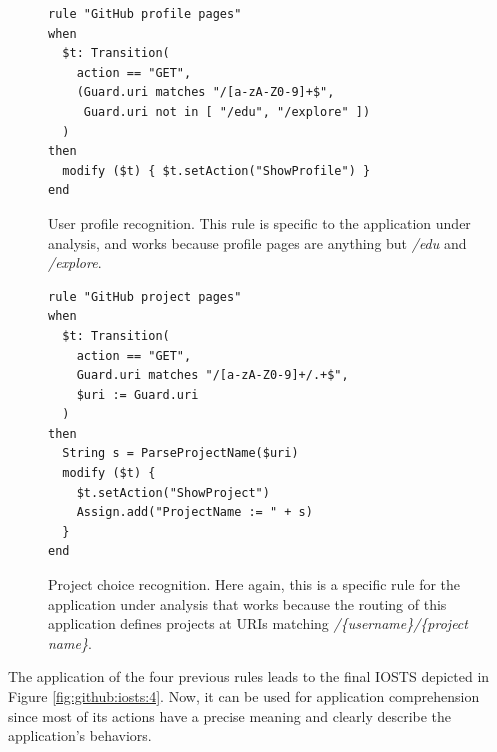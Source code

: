 \begin{figure}
\begin{framed}
\begin{BVerbatim}
rule "GitHub profile pages"
when
  $t: Transition(
    action == "GET",
    (Guard.uri matches "/[a-zA-Z0-9]+$",
     Guard.uri not in [ "/edu", "/explore" ])
  )
then
  modify ($t) { $t.setAction("ShowProfile") }
end
\end{BVerbatim}
\end{framed}

    \caption{User profile recognition. This rule is specific to the
    application under analysis, and works because profile pages are
    anything but \textit{/edu} and \textit{/explore}.}
    \label{fig:rule:gh-profile}
\end{figure}

\begin{figure}
\begin{framed}
\begin{BVerbatim}
rule "GitHub project pages"
when
  $t: Transition(
    action == "GET",
    Guard.uri matches "/[a-zA-Z0-9]+/.+$",
    $uri := Guard.uri
  )
then
  String s = ParseProjectName($uri)
  modify ($t) {
    $t.setAction("ShowProject")
    Assign.add("ProjectName := " + s)
  }
end
\end{BVerbatim}
\end{framed}

\caption{Project choice recognition. Here again, this is a
specific rule for the application under analysis that works
because the routing of this application defines projects at URIs
matching \textit{/\{username\}/\{project name\}}.}
\label{fig:rule:gh-project}
\end{figure}

\begin{example}
The application of the four previous rules leads to the final
IOSTS depicted in Figure \ref{fig:github:iosts:4}. Now, it can be
used for application comprehension since most of its actions have
a precise meaning and clearly describe the application's
behaviors.
\end{example}


